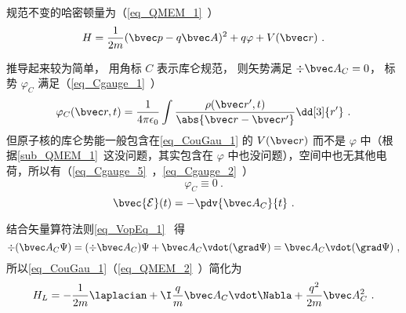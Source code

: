 
\begin{issues}
\issueDraft
\end{issues}


规范不变的哈密顿量为（\autoref{eq_QMEM_1}~）\cite{Bransden}
\begin{equation}\label{eq_CouGau_1}
H = \frac{1}{2m} (\bvec p - q\bvec A)^2 + q\varphi + V(\bvec r)~.
\end{equation}

推导起来较为简单， 用角标 $C$ 表示库仑规范， 则矢势满足 $\div \bvec A_C = 0$， 标势 $\varphi_C$ 满足（\autoref{eq_Cgauge_1}~）
\begin{equation}
\varphi_C(\bvec r, t) = \frac{1}{4\pi\epsilon_0} \int \frac{\rho(\bvec r', t)}{\abs{\bvec r - \bvec r'}} \dd[3]{r'}~.
\end{equation}
但原子核的库仑势能一般包含在\autoref{eq_CouGau_1} 的 $V(\bvec r)$ 而不是 $\varphi$ 中（根据\autoref{sub_QMEM_1}~这没问题，其实包含在 $\varphi$ 中也没问题），空间中也无其他电荷，所以有（\autoref{eq_Cgauge_5}~，\autoref{eq_Cgauge_2}~）
\begin{equation}\label{eq_CouGau_2}
\varphi_C \equiv 0~.
\end{equation}
\begin{equation}\label{eq_CouGau_3}
\bvec {\mathcal E}(t) = -\pdv{\bvec A_C}{t}~.
\end{equation}

结合矢量算符法则\autoref{eq_VopEq_1}~ 得
\begin{equation}
\div (\bvec A_C \Psi) = (\div \bvec A_C) \Psi + \bvec A_C \vdot (\grad \Psi) = \bvec A_C \vdot (\grad \Psi)~,
\end{equation}
所以\autoref{eq_CouGau_1}（\autoref{eq_QMEM_2}~）简化为
\begin{equation}\label{eq_CouGau_4}
H_L = -\frac{1}{2m} \laplacian + \I \frac{q}{m} \bvec A_C \vdot \Nabla + \frac{q^2}{2m} \bvec A_C^2~.
\end{equation}
